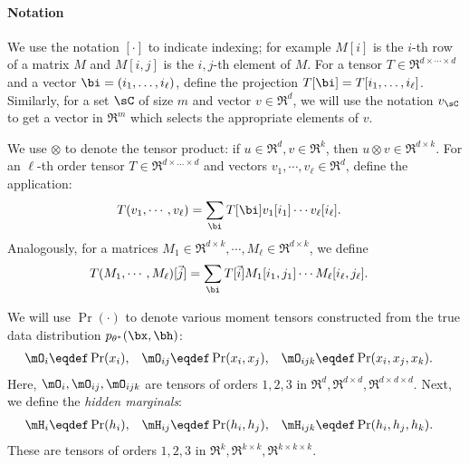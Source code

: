 \paragraph{Notation}

We use the notation $[\cdot]$ to indicate indexing; for example $M[i]$
  is the $i$-th row of a matrix $M$ and $M[i,j]$ is the $i,j$-th element
  of $M$.
For a tensor $T \in \Re^{d \times \cdots \times d}$ and a vector $\bi
  = (i_1, \ldots, i_\ell)$, define the projection $T[\bi] = T[i_1, \ldots, i_\ell]$.
Similarly, for a set $\sC$ of size $m$ and vector $v \in \Re^d$, we
  will use the notation $v_\sC$ to get a vector in $\Re^m$ which selects
  the appropriate elements of $v$.

We use $\otimes$ to denote the tensor product: if $u \in \Re^d,
  v \in \Re^k$, then $u \otimes v \in \Re^{d \times k}$.
For an $\ell$-th order tensor $T \in \Re^{d \times \ldots \times
  d}$ and vectors $v_1, \cdots, v_\ell \in \Re^{d}$, define 
  the application:
\begin{align*}
  T(v_1, \cdots, v_\ell) 
  &= \sum_{\bi}
            T[\bi] v_1[i_1] \cdots v_\ell[i_\ell].
\end{align*}
Analogously, for a matrices $M_1 \in \Re^{d \times k}, \cdots,
  M_\ell \in \Re^{d \times k}$, we define
\begin{align*}
  T(M_1, \cdots, M_\ell)[\vec j]
  &= \sum_{\bi} T[\vec i] {M_1}[i_1,j_1] \cdots M_\ell[i_\ell, j_\ell].
\end{align*}

We will use $\Pr(\cdot)$ to denote various moment tensors
constructed from the true data distribution $p_{\theta^*}(\bx,\bh)$:
\begin{align*}
  \mO_i &\eqdef \Pr(x_i), &
  \mO_{ij} &\eqdef \Pr(x_i, x_j), &
  \mO_{ijk} &\eqdef \Pr(x_i, x_j, x_k).
\end{align*}
Here, $\mO_i, \mO_{ij}, \mO_{ijk}$ are tensors of
  orders $1, 2, 3$ in $\Re^d, \Re^{d\times d}, \Re^{d \times d \times d}$.
Next, we define the \emph{hidden marginals}:
\begin{align*}
  \mH_i &\eqdef \Pr(h_i), &
  \mH_{ij} &\eqdef \Pr(h_i, h_j), &
  \mH_{ijk} &\eqdef \Pr(h_i, h_j, h_k).
\end{align*}
These are tensors of
  orders $1, 2, 3$ in $\Re^k, \Re^{k\times k}, \Re^{k \times k \times k}$.

